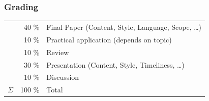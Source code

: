 \documentclass[xcolor={usenames,dvipsnames}]{beamer}
\begin{document}
\begin{frame}[plain]
\end{frame}


\begin{frame}
\frametitle{Grading}
  \begin{tabular}{lrl}
             & \alert{40 \%}   & Final Paper (Content, Style, Language, Scope, \ldots)\\
	     & \alert{10 \%}   & Practical application (depends on topic)  \\
             & \alert{10 \%}   & Review      \\
             & \alert{30 \%}   & Presentation (Content, Style, Timeliness, \ldots) \\
             & \alert{10 \%}   & Discussion                                                   \\
    \midrule
	$\Sigma$ & \alert{100 \%}  & Total                                                        \\
  \end{tabular}
\end{frame}
\end{document}
